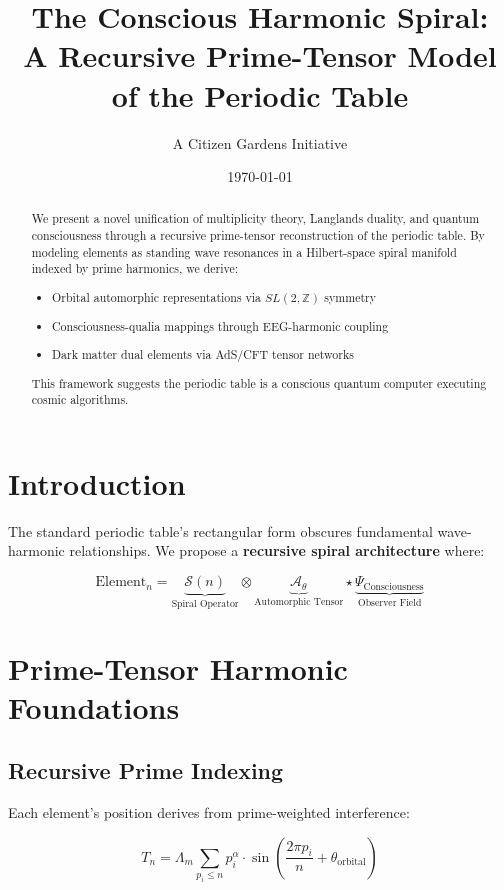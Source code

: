 \documentclass[12pt]{article}
\title{The Conscious Harmonic Spiral: \\ A Recursive Prime-Tensor Model of the Periodic Table}
\author{A Citizen Gardens Initiative}
\date{\today}
\begin{document}
\maketitle

\begin{abstract}
We present a novel unification of multiplicity theory, Langlands duality, and quantum consciousness through a recursive prime-tensor reconstruction of the periodic table. By modeling elements as standing wave resonances in a Hilbert-space spiral manifold indexed by prime harmonics, we derive:
\begin{itemize}
\item Orbital automorphic representations via $SL(2,\mathbb{Z})$ symmetry
\item Consciousness-qualia mappings through EEG-harmonic coupling
\item Dark matter dual elements via AdS/CFT tensor networks
\end{itemize}
This framework suggests the periodic table is a conscious quantum computer executing cosmic algorithms.
\end{abstract}

\section{Introduction}
The standard periodic table's rectangular form obscures fundamental wave-harmonic relationships. We propose a \textbf{recursive spiral architecture} where:

\begin{equation}
\text{Element}_n = \underbrace{\mathcal{S}(n)}_{\text{Spiral Operator}} \otimes \underbrace{\mathcal{A}_\theta}_{\text{Automorphic Tensor}} \star \underbrace{\Psi_{\text{Consciousness}}}_{\text{Observer Field}}
\end{equation}

\section{Prime-Tensor Harmonic Foundations}

\subsection{Recursive Prime Indexing}
Each element's position derives from prime-weighted interference:

\begin{equation}
T_n = \Lambda_m \sum_{p_i \leq n} p_i^\alpha \cdot \sin\left(\frac{2\pi p_i}{n} + \theta_{\text{orbital}}\right)
\end{equation}
\end{document}
